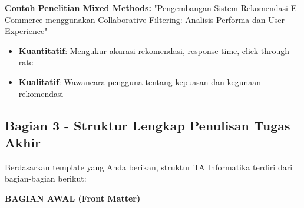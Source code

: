 \textbf{Contoh Penelitian Mixed Methods:}
"Pengembangan Sistem Rekomendasi E-Commerce menggunakan Collaborative Filtering: Analisis Performa dan User Experience"
\begin{itemize}
    \item \textbf{Kuantitatif}: Mengukur akurasi rekomendasi, response time, click-through rate
    \item \textbf{Kualitatif}: Wawancara pengguna tentang kepuasan dan kegunaan rekomendasi
\end{itemize}

\subsection*{Bagian 3 - Struktur Lengkap Penulisan Tugas Akhir}

Berdasarkan template yang Anda berikan, struktur TA Informatika terdiri dari bagian-bagian berikut:

\textbf{BAGIAN AWAL (Front Matter)}

